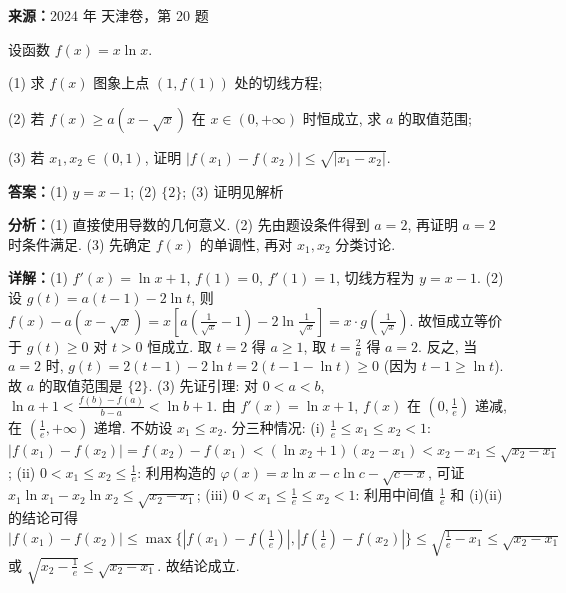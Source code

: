 \begin{question}[points=16]
\textbf{来源：}2024 年 天津卷，第 20 题\par
设函数 $f(x)=x\ln x$.

(1) 求 $f(x)$ 图象上点 $(1,f(1))$ 处的切线方程;

(2) 若 $f(x)\geq a(x-\sqrt{x})$ 在 $x\in(0,+\infty)$ 时恒成立, 求 $a$ 的取值范围;

(3) 若 $x_1,x_2\in(0,1)$, 证明 $|f(x_1)-f(x_2)|\leq \sqrt{|x_1-x_2|}$.
\begin{solution}
\textbf{答案：}(1) $y=x-1$; (2) $\{2\}$; (3) 证明见解析

\textbf{分析：}(1) 直接使用导数的几何意义. (2) 先由题设条件得到 $a=2$, 再证明 $a=2$ 时条件满足. (3) 先确定 $f(x)$ 的单调性, 再对 $x_1,x_2$ 分类讨论.

\textbf{详解：}(1) $f'(x)=\ln x+1$, $f(1)=0$, $f'(1)=1$, 切线方程为 $y=x-1$.
(2) 设 $g(t)=a(t-1)-2\ln t$, 则 $f(x)-a(x-\sqrt{x})=x\left[a\left(\frac{1}{\sqrt{x}}-1\right)-2\ln\frac{1}{\sqrt{x}}\right]=x\cdot g\left(\frac{1}{\sqrt{x}}\right)$. 故恒成立等价于 $g(t)\geq 0$ 对 $t>0$ 恒成立. 取 $t=2$ 得 $a\geq 1$, 取 $t=\frac{2}{a}$ 得 $a=2$. 反之, 当 $a=2$ 时, $g(t)=2(t-1)-2\ln t=2(t-1-\ln t)\geq 0$ (因为 $t-1\geq\ln t$). 故 $a$ 的取值范围是 $\{2\}$.
(3) 先证引理: 对 $0<a<b$, $\ln a+1<\frac{f(b)-f(a)}{b-a}<\ln b+1$. 由 $f'(x)=\ln x+1$, $f(x)$ 在 $(0,\frac{1}{e})$ 递减, 在 $(\frac{1}{e},+\infty)$ 递增. 不妨设 $x_1\leq x_2$. 分三种情况: (i) $\frac{1}{e}\leq x_1\leq x_2<1$: $|f(x_1)-f(x_2)|=f(x_2)-f(x_1)<(\ln x_2+1)(x_2-x_1)<x_2-x_1\leq \sqrt{x_2-x_1}$; (ii) $0<x_1\leq x_2\leq \frac{1}{e}$: 利用构造的 $\varphi(x)=x\ln x - c\ln c - \sqrt{c-x}$, 可证 $x_1\ln x_1 - x_2\ln x_2 \leq \sqrt{x_2-x_1}$; (iii) $0<x_1\leq \frac{1}{e}\leq x_2<1$: 利用中间值 $\frac{1}{e}$ 和 (i)(ii) 的结论可得 $|f(x_1)-f(x_2)|\leq \max\{|f(x_1)-f(\frac{1}{e})|, |f(\frac{1}{e})-f(x_2)|\}\leq \sqrt{\frac{1}{e}-x_1}\leq \sqrt{x_2-x_1}$ 或 $\sqrt{x_2-\frac{1}{e}}\leq \sqrt{x_2-x_1}$. 故结论成立.
\end{solution}
\end{question}

